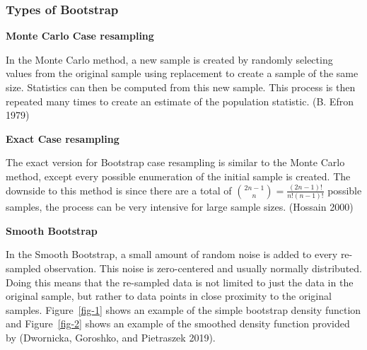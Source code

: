 \documentclass[
  letterpaper,
  DIV=11,
  numbers=noendperiod]{scrartcl}
\begin{document}
\hypertarget{types-of-bootstrap}{%
\subsubsection{Types of Bootstrap}\label{types-of-bootstrap}}

\textbf{Monte Carlo Case resampling}

In the Monte Carlo method, a new sample is created by randomly selecting
values from the original sample using replacement to create a sample of
the same size. Statistics can then be computed from this new sample.
This process is then repeated many times to create an estimate of the
population statistic. (B. Efron 1979)

\textbf{Exact Case resampling}

The exact version for Bootstrap case resampling is similar to the Monte
Carlo method, except every possible enumeration of the initial sample is
created. The downside to this method is since there are a total of
\({2n - 1 \choose n} = \frac{(2n - 1)!}{n!(n - 1)!}\) possible samples,
the process can be very intensive for large sample sizes. (Hossain 2000)

\textbf{Smooth Bootstrap}

In the Smooth Bootstrap, a small amount of random noise is added to
every re-sampled observation. This noise is zero-centered and usually
normally distributed. Doing this means that the re-sampled data is not
limited to just the data in the original sample, but rather to data
points in close proximity to the original samples. Figure~\ref{fig-1}
shows an example of the simple bootstrap density function and
Figure~\ref{fig-2} shows an example of the smoothed density function
provided by (Dwornicka, Goroshko, and Pietraszek 2019).
\end{document}
